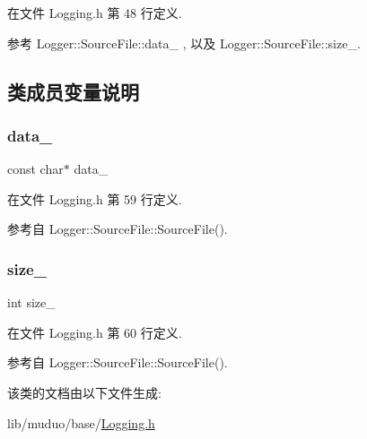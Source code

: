 在文件 Logging.\+h 第 48 行定义.



参考 Logger\+::\+Source\+File\+::data\+\_\+ , 以及 Logger\+::\+Source\+File\+::size\+\_\+.



\subsection{类成员变量说明}
\mbox{\label{classmuduo_1_1Logger_1_1SourceFile_a87cb119678e603084928af555fe13e36}} 
\subsubsection{\texorpdfstring{data\+\_\+}{data\_}}
{\footnotesize\ttfamily const char$\ast$ data\+\_\+}



在文件 Logging.\+h 第 59 行定义.



参考自 Logger\+::\+Source\+File\+::\+Source\+File().

\mbox{\label{classmuduo_1_1Logger_1_1SourceFile_a6947fa5d6ba628dd62d59ffbad8b8d80}} 
\subsubsection{\texorpdfstring{size\+\_\+}{size\_}}
{\footnotesize\ttfamily int size\+\_\+}



在文件 Logging.\+h 第 60 行定义.



参考自 Logger\+::\+Source\+File\+::\+Source\+File().



该类的文档由以下文件生成\+:\begin{DoxyCompactItemize}
\item 
lib/muduo/base/\hyperlink{Logging_8h}{Logging.\+h}\end{DoxyCompactItemize}
